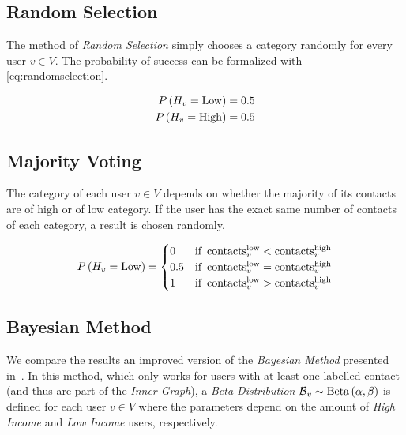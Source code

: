 

\subsection{Random Selection}

The method of \emph{Random Selection} simply chooses a category randomly for every user $v \in V$. The probability of success can be formalized with \cref{eq:randomselection}.

\begin{equation}
\label{eq:randomselection}
\begin{aligned}
	P \left( H_v = \operatorname{Low} \right) &= 0.5 \\
	P \left( H_v = \operatorname{High} \right) &= 0.5
\end{aligned}
\end{equation}

\subsection{Majority Voting}

The category of each user $v \in V$ depends on whether the majority of its contacts are of high or of low category. If the user has the exact same number of contacts of each category, a result is chosen randomly.

\begin{equation}
\label{eq:majorityvoting}
	P \left( H_v = \operatorname{Low} \right) =
	\begin{cases}
		0 & \text{if} \ \operatorname{contacts}^{\operatorname{low}}_v < \operatorname{contacts}^{\operatorname{high}}_v \\
		0.5 & \text{if} \ \operatorname{contacts}^{\operatorname{low}}_v = \operatorname{contacts}^{\operatorname{high}}_v \\
		1 & \text{if} \ \operatorname{contacts}^{\operatorname{low}}_v > \operatorname{contacts}^{\operatorname{high}}_v
	\end{cases}
\end{equation}

\subsection{Bayesian Method}

We compare the results an improved version of the \emph{Bayesian Method} presented in~\cite{fixmanasonam2016}. In this method, which only works for users with at least one labelled contact (and thus are part of the \emph{Inner Graph}), a \emph{Beta Distribution} $\operatorname{\mathcal{B}}_v \sim \operatorname{Beta} \left( \alpha, \beta \right)$ is defined for each user $v \in V$ where the parameters depend on the amount of \emph{High Income} and \emph{Low Income} users, respectively.

